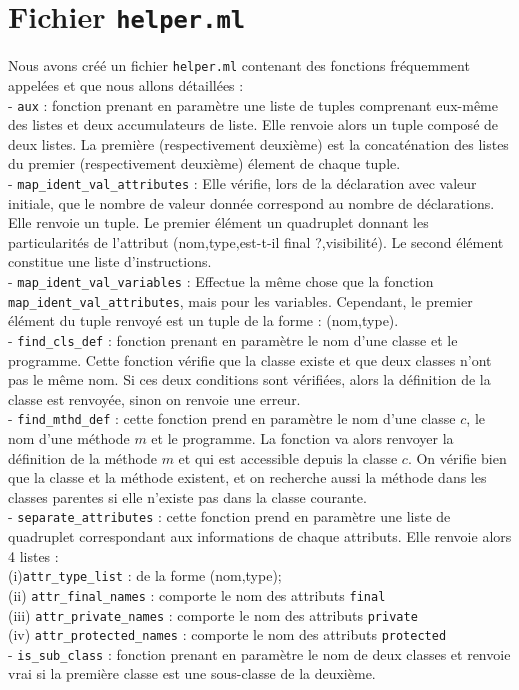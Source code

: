 \documentclass{article}
\begin{document}
\section{Fichier \texttt{helper.ml}}
Nous avons créé un fichier \texttt{helper.ml} contenant des fonctions fréquemment appelées et que nous allons détaillées :  
\smallskip\\
- \texttt{aux} : fonction prenant en paramètre une liste de tuples comprenant eux-même des listes et deux accumulateurs de liste. Elle renvoie alors un tuple composé de deux listes. La première (respectivement deuxième) est la concaténation des listes du premier (respectivement deuxième) élement de chaque tuple. 
\medskip\\
- \texttt{map\_ident\_val\_attributes} : Elle vérifie, lors de la déclaration avec valeur initiale, que le nombre de valeur donnée correspond au nombre de déclarations. Elle renvoie un tuple. Le premier élément un quadruplet donnant les particularités de l'attribut (nom,type,est-t-il final ?,visibilité). Le second élément constitue une liste d'instructions.  
\medskip\\
- \texttt{map\_ident\_val\_variables} : Effectue la même chose que la fonction \texttt{map\_ident\_val\_attributes}, mais pour les variables. Cependant, le premier élément du tuple renvoyé est un tuple de la forme : (nom,type). \medskip\\
- \texttt{find\_cls\_def} : fonction prenant en paramètre le nom d'une classe et le programme. Cette fonction vérifie que la classe existe et que deux classes n'ont pas le même nom. Si ces deux conditions sont vérifiées, alors la définition de la classe est renvoyée, sinon on renvoie une erreur. 
\medskip\\
- \texttt{find\_mthd\_def} : cette fonction prend en paramètre le nom d'une classe $c$, le nom d'une méthode $m$ et le programme. La fonction va alors renvoyer la définition de la méthode $m$ et qui est accessible depuis la classe $c$. On vérifie bien que la classe et la méthode existent, et on recherche aussi la méthode dans les classes parentes si elle n'existe pas dans la classe courante.
\medskip\\
- \texttt{separate\_attributes} : cette fonction prend en paramètre une liste de quadruplet correspondant aux informations de chaque attributs. Elle renvoie alors 4 listes : \\
(i)\hspace{0.5cm}\texttt{attr\_type\_list} : de la forme (nom,type);\\
(ii)\hspace{0.3cm} \texttt{attr\_final\_names} : comporte le nom des attributs \texttt{final}\\
(iii)\hspace{0.2cm} \texttt{attr\_private\_names} : comporte le nom des attributs \texttt{private}\\
(iv)\hspace{0.2cm} \texttt{attr\_protected\_names} : comporte le nom des attributs \texttt{protected}
\medskip\\
- \texttt{is\_sub\_class} : fonction prenant en paramètre le nom de deux classes et renvoie vrai si la première classe est une sous-classe de la deuxième.
\end{document}
